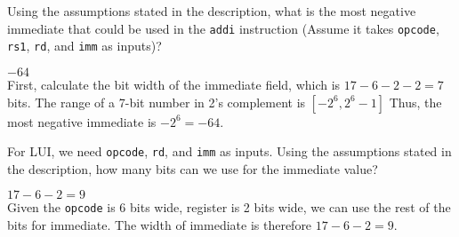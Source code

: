 \begin{blocksection}
\question
Using the assumptions stated in the description, what is the most negative immediate that could be used in the \lstinline$addi$ instruction (Assume it takes \lstinline$opcode$, \lstinline$rs1$, \lstinline$rd$, and \lstinline$imm$ as inputs)?
\begin{solution}[0.5in]
$-64$ \\
First, calculate the bit width of the immediate field, which is $17 − 6 − 2 − 2 = 7$ bits. The range of a 7-bit number in 2’s complement is $[−2^{6}, 2^{6} − 1]$ Thus, the most negative immediate is $−2^{6} = −64$.
\end{solution}

\question
For LUI, we need \lstinline$opcode$, \lstinline$rd$, and \lstinline$imm$ as inputs. Using the assumptions stated in the description, how many bits can we use for the immediate value?
\begin{solution}[0.5in]
$17-6-2 = 9$ \\
Given the \lstinline$opcode$ is 6 bits wide, register is 2 bits wide, we can use the rest of the bits for immediate. The width of immediate is therefore $17 − 6 − 2 = 9$.
\end{solution}


\end{blocksection}